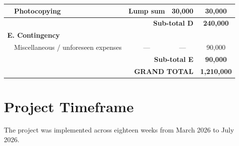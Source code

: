 \documentclass[12pt,a4paper]{report}
\begin{document}
\begin{longtable}{p{3.5cm}p{4.5cm}ccc}
 & Photocopying & Lump sum & 30,000 & 30,000\\
\midrule
\multicolumn{4}{r}{\textbf{Sub-total D}} & \textbf{240,000}\\
\midrule
\multicolumn{5}{l}{\textbf{E. Contingency}}\\
\midrule
 & Miscellaneous / unforeseen expenses & --- & --- & 90,000\\
\midrule
\multicolumn{4}{r}{\textbf{Sub-total E}} & \textbf{90,000}\\
\midrule
\multicolumn{4}{r}{\textbf{GRAND TOTAL}} & \textbf{1,210,000}\\
\bottomrule
\end{longtable}


\chapter{Project Timeframe}

The project was implemented across eighteen weeks from March 2026 to July 2026.

\vspace{1.5cm}
\end{document}
